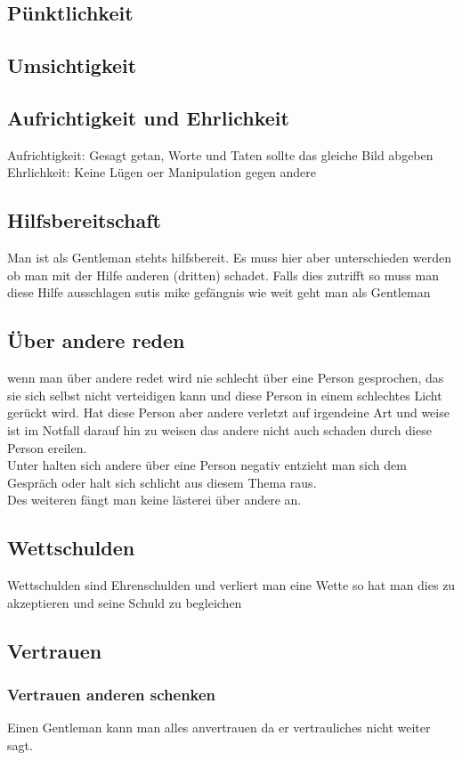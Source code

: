         \subsection{Pünktlichkeit}
        \subsection{Umsichtigkeit}
        \subsection{Aufrichtigkeit und Ehrlichkeit}
            Aufrichtigkeit: Gesagt getan, Worte und Taten sollte das gleiche Bild abgeben
            Ehrlichkeit: Keine Lügen oer Manipulation gegen andere 
        \subsection{Hilfsbereitschaft}
            Man ist als Gentleman stehts hilfsbereit. Es muss hier aber unterschieden werden ob man mit der Hilfe anderen (dritten) schadet. Falls dies zutrifft so muss man diese Hilfe ausschlagen {\color{red}sutis mike gefängnis}
            wie weit geht man als Gentleman 
        \subsection{Über andere reden}
            wenn man über andere redet wird nie schlecht über eine Person gesprochen, das sie sich selbst nicht verteidigen kann und diese Person in einem schlechtes Licht gerückt wird. Hat diese Person aber andere verletzt auf irgendeine Art und weise ist im Notfall darauf hin zu weisen das andere nicht auch schaden durch diese Person ereilen. \\
            Unter halten sich andere über eine Person negativ entzieht man sich dem Gespräch oder halt sich schlicht aus diesem Thema raus. \\
            Des weiteren fängt man keine lästerei über andere an. 
        \subsection{Wettschulden}  
            Wettschulden sind Ehrenschulden und verliert man eine Wette so hat man dies zu akzeptieren und seine Schuld zu begleichen 
        \subsection{Vertrauen}
            \subsubsection{Vertrauen anderen schenken}
                Einen Gentleman kann man alles anvertrauen da er vertrauliches nicht weiter sagt.
